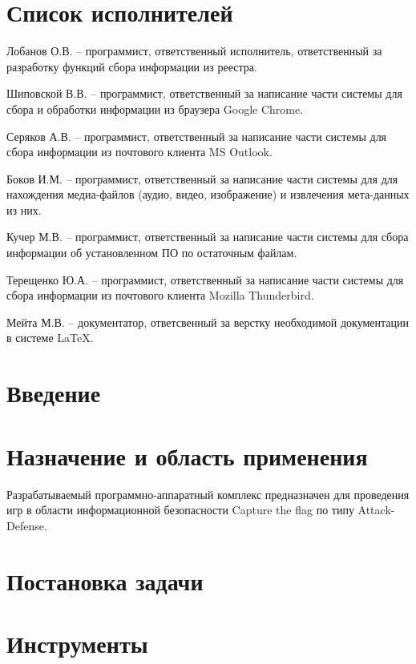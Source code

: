 


 
 
 
 \newpage
 \section*{Список исполнителей}
 
Лобанов О.В. -- программист, ответственный исполнитель, ответственный за разработку функций сбора информации из реестра. 

Шиповской В.В. -- программист, ответственный за написание части системы для сбора и обработки информации из браузера Google Chrome.

Серяков А.В. -- программист, ответственный за написание части системы для сбора информации из почтового клиента MS Outlook.

Боков И.М. -- программист, ответственный за написание части системы для для нахождения медиа-файлов (аудио, видео, изображение) и извлечения мета-данных из них.

Кучер М.В. -- программист, ответственный за написание части системы для сбора информации об установленном ПО по остаточным файлам.

Терещенко Ю.А. -- программист, ответственный за написание части системы для сбора информации из почтового клиента Mozilla Thunderbird.

Мейта М.В. -- документатор, ответсвенный за верстку необходимой документации в системе \LaTeX.

 
 \newpage
 \tableofcontents

 \newpage
 \section*{Введение}
 

 \section{Назначение и область применения}
Разрабатываемый программно-аппаратный комплекс предназначен для проведения игр в области информационной безопасности Capture the flag по типу Attack-Defense.
\section{Постановка задачи}
\setcounter{figure}{0}

\section{Инструменты}
\setcounter{figure}{0}
